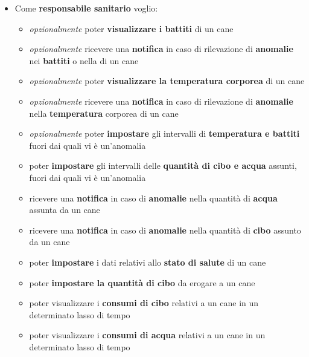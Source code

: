 \begin{itemize}
            \item Come \textbf{responsabile sanitario}
            voglio:
            \begin{itemize}
                \item \textit{opzionalmente} poter \textbf{visualizzare i battiti} di un cane 
                \item  \textit{opzionalmente} ricevere una \textbf{notifica} in caso di rilevazione di \textbf{anomalie} nei \textbf{battiti} o nella di un cane
                \item \textit{opzionalmente} poter \textbf{visualizzare la temperatura corporea} di un cane
                \item \textit{opzionalmente} ricevere una \textbf{notifica} in caso di rilevazione di \textbf{anomalie} nella \textbf{temperatura} corporea di un cane
                 \item \textit{opzionalmente} poter \textbf{impostare} gli intervalli di \textbf{temperatura e battiti} fuori dai quali vi è un’anomalia
                \item poter \textbf{impostare} gli intervalli delle \textbf{quantità di cibo e acqua } assunti, fuori dai quali vi è un’anomalia
                \item ricevere una \textbf{notifica} in caso di \textbf{anomalie} nella quantità di \textbf{acqua} assunta da un cane
                \item ricevere una \textbf{notifica} in caso di \textbf{anomalie} nella quantità di \textbf{cibo} assunto da un cane
                \item poter \textbf{impostare} i dati relativi allo \textbf{stato di salute} di un cane
                \item poter \textbf{impostare la quantità di cibo} da erogare a un cane
                \item poter visualizzare i \textbf{consumi di cibo} relativi a un cane in un determinato lasso di tempo
                \item poter visualizzare i \textbf{consumi di acqua} relativi a un cane in un determinato lasso di tempo
            \end{itemize}
            

\end{itemize}
